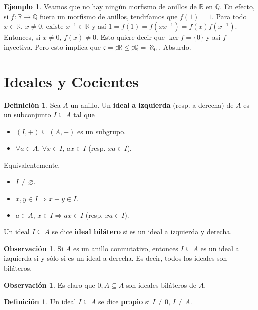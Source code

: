 \documentclass[12pt]{book}
\theoremstyle{definition}
\newtheorem{obs}[teo]{Observación}
\newtheorem{defn}[teo]{Definición}
\newtheorem{ex}[teo]{Ejemplo}
\newcommand{\RR}{\mathbb{R}}      %
\newcommand{\QQ}{\mathbb{Q}}
\let\emptyset\varnothing
\begin{document}
\begin{ex}
Veamos que no hay ningún morfismo de anillos de $\RR$ en $\QQ$. En efecto, si $f:\RR\to \QQ$ fuera un morfismo de anillos, tendríamos que $f(1)=1$. Para todo $x\in \RR$, $x\neq 0$, existe $x^{-1}\in \RR$ y así $1=f(1)=f(xx^{-1})=f(x)f(x^{-1})$. Entonces, si $x\neq 0$, $f(x)\neq 0$. Esto quiere decir que $\ker f = \{0 \}$ y así $f$ inyectiva. Pero esto implica que $\mathfrak{c}=\sharp \RR \leq \sharp \QQ = \aleph_0$. Absurdo.
\end{ex}

\section{Ideales y Cocientes}

\begin{defn}
Sea $A$ un anillo. Un \textbf{ideal a izquierda} (resp. a derecha) de $A$ es un subconjunto $I\subseteq A$ tal que \begin{itemize} \item $(I,+)\subseteq (A,+)$ es un subgrupo. \item $\forall a\in A$, $\forall x\in I$, $ax\in I$ (resp. $xa\in I$).\end{itemize} Equivalentemente, \begin{itemize} \item $I\neq \emptyset$. \item $x,y\in I \Longrightarrow x+y\in I$. \item $a\in A$, $x\in I \Longrightarrow ax\in I$ (resp. $xa\in I$).\end{itemize}

Un ideal $I\subseteq A$ se dice \textbf{ideal bilátero} si es un ideal a izquierda y derecha.
\end{defn}

\begin{obs}
Si $A$ es un anillo conmutativo, entonces $I\subseteq A$ es un ideal a izquierda si y sólo si es un ideal a derecha. Es decir, todos los ideales son biláteros.
\end{obs}

\begin{obs}
Es claro que $0,A\subseteq A$ son ideales biláteros de $A$.
\end{obs}

\begin{defn}
Un ideal $I\subseteq A$ se dice \textbf{propio} si $I\neq 0$, $I\neq A$.
\end{defn}
\end{document}
